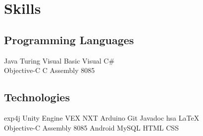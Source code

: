 \documentclass[]{deedy-resume-openfont}
\begin{document}
\begin{minipage}[t]{0.33\textwidth}




\section{Skills}
\subsection{Programming Languages}
Java \textbullet{}  Turing \textbullet{} Visual Basic \textbullet{}
Visual C\# \\ 
\vspace{1mm}
Objective-C \textbullet{} C \textbullet{} Assembly 8085
\sectionsep

\subsection{Technologies}
exp4j \textbullet{}   Unity Engine \textbullet{} VEX \textbullet{} NXT \textbullet{} Arduino \textbullet{} Git 
\textbullet{} Javadoc \textbullet{} hsa \textbullet{} \LaTeX\
\\ 
\vspace{1mm}
Objective-C \textbullet{} Assembly 8085 \textbullet{} Android \textbullet{} MySQL \textbullet{} HTML \textbullet{} CSS
\sectionsep


\end{minipage}
\end{document}

